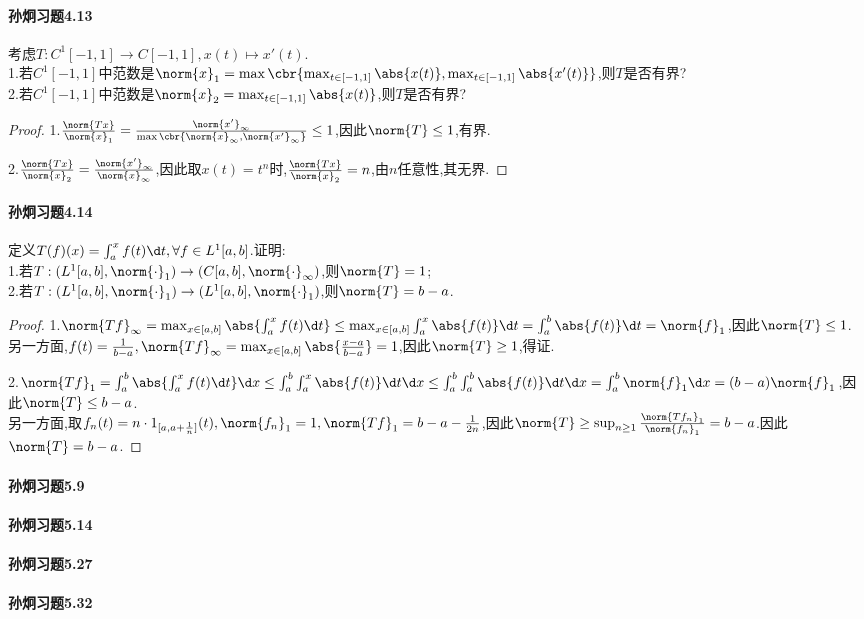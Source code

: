 \documentclass{article}
\begin{document}
\paragraph{孙炯习题4.13}考虑$T:C^1[-1,1]\to C[-1,1], x(t)\mapsto x'(t)$.\\
1.若$C^1[-1,1]$中范数是$\norm{x}_1=\max\cbr{\max_{t\in [-1,1]}\abs{x(t)},\max_{t\in [-1,1]}\abs{x'(t)}}$,则$T$是否有界?\\
2.若$C^1[-1,1]$中范数是$\norm{x}_2=\max_{t\in [-1,1]}\abs{x(t)}$,则$T$是否有界?
\begin{proof}
    1.$\frac{\norm{Tx}}{\norm{x}_1}=\frac{\norm{x'}_\infty}{\max\cbr{\norm{x}_\infty,\norm{x'}_\infty}}\leq 1$,因此$\norm{T}\leq 1$,有界.

    2.$\frac{\norm{Tx}}{\norm{x}_2}=\frac{\norm{x'}_\infty}{\norm{x}_\infty}$,因此取$x(t)=t^n$时,$\frac{\norm{Tx}}{\norm{x}_2}=n$,由$n$任意性,其无界.
\end{proof}

\paragraph{孙炯习题4.14}定义$T(f)(x)=\int_a^x f(t)\d t,\forall f\in L^1[a,b]$.证明:\\
1.若$T:(L^1[a,b],\norm{\cdot}_1)\to (C[a,b],\norm{\cdot}_\infty)$,则$\norm{T}=1$;\\
2.若$T:(L^1[a,b],\norm{\cdot}_1)\to (L^1[a,b],\norm{\cdot}_1)$,则$\norm{T}=b-a$.
\begin{proof}
    1.$\norm{Tf}_\infty=\max_{x\in [a,b]}\abs{\int_a^x f(t)\d t}\leq \max_{x\in [a,b]}\int_a^x \abs{f(t)}\d t=\int_a^b \abs{f(t)}\d t=\norm{f}_1$,因此$\norm{T}\leq 1$.\\
    另一方面,$f(t)=\frac{1}{b-a}, \norm{Tf}_\infty=\max_{x\in [a,b]}\abs{\frac{x-a}{b-a}}=1$,因此$\norm{T}\geq 1$,得证.

    2.$\norm{Tf}_1=\int_a^b\abs{\int_a^xf(t)\d t}\d x\leq \int_a^b\int_a^x\abs{f(t)}\d t\d x\leq \int_a^b\int_a^b\abs{f(t)}\d t\d x=\int_a^b\norm{f}_1\d x=(b-a)\norm{f}_1$,因此$\norm{T}\leq b-a$.\\
    另一方面,取$f_n(t)=n\cdot 1_{[a,a+\frac{1}{n}]}(t),\norm{f_n}_1=1,\norm{Tf}_1=b-a-\frac{1}{2n}$,因此$\norm{T}\geq \sup_{n\geq 1}\frac{\norm{Tf_n}_1}{\norm{f_n}_1}=b-a$.因此$\norm{T}=b-a$.
\end{proof}

\paragraph{孙炯习题5.9}
\paragraph{孙炯习题5.14}
\paragraph{孙炯习题5.27}
\paragraph{孙炯习题5.32}
\end{document}
